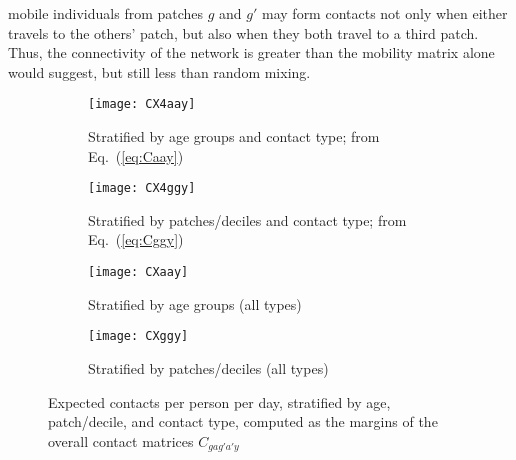 mobile individuals from patches $g$ and $g'$ may form contacts
not only when either travels to the others' patch,
but also when they both travel to a third patch.
Thus, the connectivity of the network is greater than the mobility matrix alone would suggest,
but still less than random mixing.
\begin{figure}
  \begin{subfigure}{\linewidth}
    \texttt{[image: CX4aay]}
    \caption{Stratified by age groups and contact type; from Eq.~(\ref{eq:Caay})}
    \label{fig:CX4aay}
  \end{subfigure}
  \begin{subfigure}{\linewidth}
    \texttt{[image: CX4ggy]}
    \caption{Stratified by patches/deciles and contact type; from Eq.~(\ref{eq:Cggy})}
    \label{fig:CX4ggy}
  \end{subfigure}
  \begin{subfigure}{0.48\linewidth}
    \centering
    \texttt{[image: CXaay]}
    \caption{Stratified by age groups (all types)}
    \label{fig:CXaay}
  \end{subfigure}\hfill%
  \begin{subfigure}{0.48\linewidth}
    \centering
    \texttt{[image: CXggy]}
    \caption{Stratified by patches/deciles (all types)}
    \label{fig:CXggy}
  \end{subfigure}
  \caption{Expected contacts per person per day, stratified by age, patch/decile, and contact type,
    computed as the margins of the overall contact matrices $C_{gag'a'y}$}
  \label{fig:CX4y}
\end{figure}